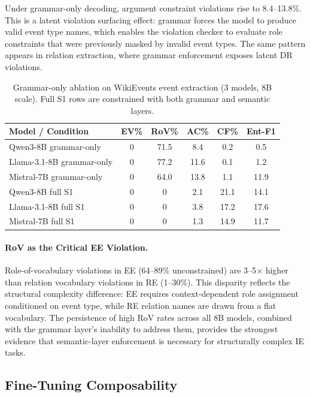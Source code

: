 \documentclass[11pt,a4paper]{article}
\begin{document}
Under grammar-only decoding, argument constraint violations rise to 8.4--13.8\%. This is a latent violation surfacing effect: grammar forces the model to produce valid event type names, which enables the violation checker to evaluate role constraints that were previously masked by invalid event types. The same pattern appears in relation extraction, where grammar enforcement exposes latent DR violations.

\begin{table}[t]
\centering
\caption{Grammar-only ablation on WikiEvents event extraction (3 models, 8B scale). Full S1 rows are constrained with both grammar and semantic layers.}
\label{tab:grammar-ablation}
\small
\begin{tabular}{lccccc}
\toprule
Model / Condition & EV\% & RoV\% & AC\% & CF\% & Ent-F1 \\
\midrule
Qwen3-8B grammar-only & 0 & 71.5 & 8.4 & 0.2 & 0.5 \\
Llama-3.1-8B grammar-only & 0 & 77.2 & 11.6 & 0.1 & 1.2 \\
Mistral-7B grammar-only & 0 & 64.0 & 13.8 & 1.1 & 11.9 \\
\midrule
Qwen3-8B full S1 & 0 & 0 & 2.1 & 21.1 & 14.1 \\
Llama-3.1-8B full S1 & 0 & 0 & 3.8 & 17.2 & 17.6 \\
Mistral-7B full S1 & 0 & 0 & 1.3 & 14.9 & 11.7 \\
\bottomrule
\end{tabular}
\end{table}

\paragraph{RoV as the Critical EE Violation.}
Role-of-vocabulary violations in EE (64--89\% unconstrained) are 3--5$\times$ higher than relation vocabulary violations in RE (1--30\%). This disparity reflects the structural complexity difference: EE requires context-dependent role assignment conditioned on event type, while RE relation names are drawn from a flat vocabulary. The persistence of high RoV rates across all 8B models, combined with the grammar layer's inability to address them, provides the strongest evidence that semantic-layer enforcement is necessary for structurally complex IE tasks.

\subsection{Fine-Tuning Composability}
\label{sec:ft}
\end{document}
